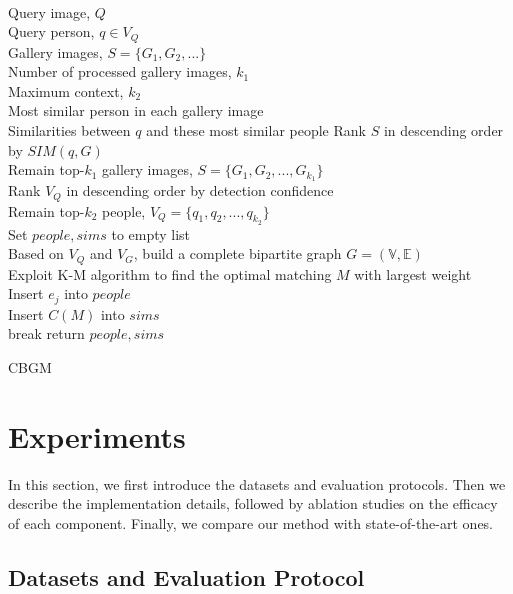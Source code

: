 \documentclass[letterpaper]{article} \usepackage{aaai21}  \usepackage{times}  \usepackage{helvet} \usepackage{courier}  \usepackage[hyphens]{url}  \usepackage{graphicx} \urlstyle{rm} \def\UrlFont{\rm}  \usepackage{natbib}  \usepackage{caption} \usepackage{multirow}
\begin{document}
\begin{algorithm}[t]
    \DontPrintSemicolon
      \KwInput
      {
          ~~\\
          Query image, $Q$\\
          Query person, $q\in V_Q$\\
          Gallery images, $S=\{G_1,G_2,...\}$\\
          Number of processed gallery images, $k_1$\\
          Maximum context, $k_2$
      }
      \KwOutput
      {
          ~~\\
          Most similar person in each gallery image\\
          Similarities between $q$ and these most similar people
      }
      Rank $S$ in descending order by $SIM(q,G)$\\
      Remain top-$k_1$ gallery images, $S=\{G_1,G_2,...,G_{k_1}\}$\\
      Rank $V_Q$ in descending order by detection confidence\\
      Remain top-$k_2$ people, $V_Q=\{q_1,q_2,...,q_{k_2}\}$\\
      Set $people,sims$ to empty list\\
      {
          Based on $V_Q$ and $V_G$, build a complete bipartite graph $G=(\mathbb{V},\mathbb{E})$\\
          Exploit K-M algorithm to find the optimal matching $M$ with largest weight\\
          {
              {
                  Insert $e_j$ into $people$\\
                  Insert $C(M)$ into $sims$\\
                  break
              }
          }
      }
      return $people,sims$
    \caption{CBGM}
    \label{CBGM}
\end{algorithm}



\section{Experiments}
In this section, we first introduce the datasets and evaluation protocols. Then we describe the implementation details, followed by ablation studies on the efficacy of each component. Finally, we compare our method with state-of-the-art ones.

\subsection{Datasets and Evaluation Protocol}
\end{document}
